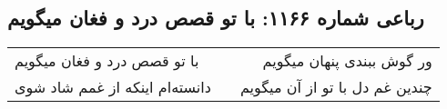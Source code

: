 \begin{center}
\section*{رباعی شماره ۱۱۶۶: با تو قصص درد و فغان میگویم}
\label{sec:1166}
\begin{longtable}{l p{0.5cm} r}
با تو قصص درد و فغان میگویم
&&
ور گوش ببندی پنهان میگویم
\\
دانسته‌ام اینکه از غمم شاد شوی
&&
چندین غم دل با تو از آن میگویم
\\
\end{longtable}
\end{center}
